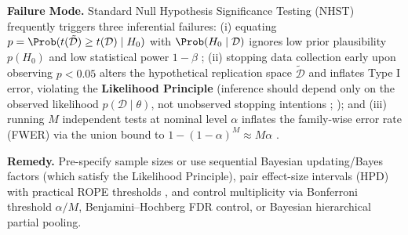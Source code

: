 \documentclass[../../../../master.tex]{subfiles}
\begin{document}
\begin{pitfall}
\textbf{Failure Mode.} Standard Null Hypothesis Significance Testing (NHST) frequently triggers three inferential failures: (i) equating $p = \Prob(t(\tilde{\mathcal{D}}) \ge t(\mathcal{D}) \mid H_0)$ with $\Prob(H_0 \mid \mathcal{D})$ ignores low prior plausibility $p(H_0)$ and low statistical power $1-\beta$ ; (ii) stopping data collection early upon observing $p < 0.05$ alters the hypothetical replication space $\tilde{\mathcal{D}}$ and inflates Type I error, violating the \textbf{Likelihood Principle} (inference should depend only on the observed likelihood $p(\mathcal{D}\mid\theta)$, not unobserved stopping intentions ; ); and (iii) running $M$ independent tests at nominal level $\alpha$ inflates the family-wise error rate (FWER) via the union bound to $1 - (1-\alpha)^M \approx M\alpha$ .

\textbf{Remedy.} Pre-specify sample sizes or use sequential Bayesian updating/Bayes factors (which satisfy the Likelihood Principle), pair effect-size intervals (HPD) with practical ROPE thresholds , and control multiplicity via Bonferroni threshold $\alpha/M$, Benjamini--Hochberg FDR control, or Bayesian hierarchical partial pooling.
\end{pitfall}
\end{document}
